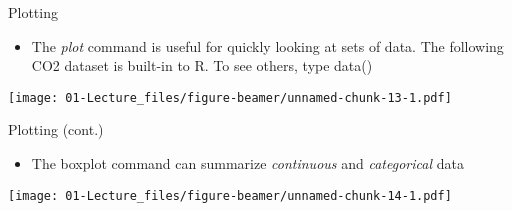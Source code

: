 \documentclass[
  ignorenonframetext,
  aspectratio=169]{beamer}
\newenvironment{Shaded}{\begin{snugshade}}{\end{snugshade}}
\newcommand{\AttributeTok}[1]{\textcolor[rgb]{0.13,0.29,0.53}{#1}}
\newcommand{\CommentTok}[1]{\textcolor[rgb]{0.56,0.35,0.01}{\textit{#1}}}
\newcommand{\FunctionTok}[1]{\textcolor[rgb]{0.13,0.29,0.53}{\textbf{#1}}}
\newcommand{\NormalTok}[1]{#1}
\newcommand{\SpecialCharTok}[1]{\textcolor[rgb]{0.81,0.36,0.00}{\textbf{#1}}}
\newcommand{\StringTok}[1]{\textcolor[rgb]{0.31,0.60,0.02}{#1}}
\providecommand{\tightlist}{%
  \setlength{\itemsep}{0pt}\setlength{\parskip}{0pt}}
\begin{document}
\begin{frame}[fragile]{Plotting}
\protect\hypertarget{plotting}{}
\begin{itemize}[<+->]
\tightlist
\item
  The \emph{plot} command is useful for quickly looking at sets of data.
  The following CO2 dataset is built-in to R. To see others, type data()
\end{itemize}

\footnotesize

\begin{Shaded}
\end{Shaded}

\texttt{[image: 01-Lecture\_files/figure-beamer/unnamed-chunk-13-1.pdf]}

\normalsize
\end{frame}

\begin{frame}[fragile]{Plotting (cont.)}
\protect\hypertarget{plotting-cont.}{}
\begin{itemize}[<+->]
\tightlist
\item
  The boxplot command can summarize \emph{continuous} and
  \emph{categorical} data
\end{itemize}

\footnotesize

\begin{Shaded}
\end{Shaded}

\texttt{[image: 01-Lecture\_files/figure-beamer/unnamed-chunk-14-1.pdf]}

\normalsize
\end{frame}
\end{document}
